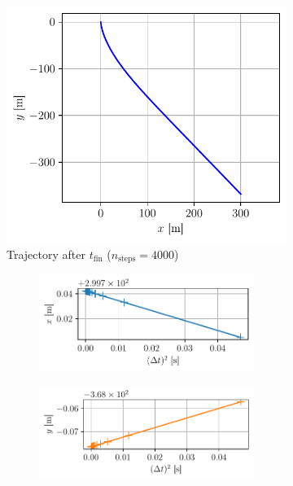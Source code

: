 \begin{figure}[h]
    \centering
    \begin{subfigure}{0.49\linewidth}
        \centering
        \includegraphics[width=\linewidth]{figures/grav_frict_position.pdf}
        \caption{Trajectory after $t_\textrm{fin}$ ($n_\textrm{steps}=4000$)}
        \label{fig:gravfrict:pos}
    \end{subfigure}%
    \hspace*{0.2cm}
    \begin{subfigure}{0.45\linewidth}
        \begin{subfigure}{\linewidth}
            \centering
            \includegraphics[width=\linewidth]{figures/grav_frict_convergence_x.pdf}
        \end{subfigure}
        \begin{subfigure}{\linewidth}
            \centering
            \includegraphics[width=\linewidth]{figures/grav_frict_convergence_y.pdf}

\end{subfigure}
\end{subfigure}
\end{figure}
